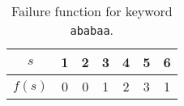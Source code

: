 \begin{table}[!ht]
    \centering
    \begin{tabular}{|c||c|c|c|c|c|c|}
        \hline
        $s$ & 1 & 2 & 3 & 4 & 5 & 6 \\
        \hline
        $f(s)$ & 0 & 0 & 1 & 2 & 3 & 1 \\
        \hline
    \end{tabular}
    \caption{Failure function for keyword \texttt{ababaa}.}
    \label{tab:030406}
\end{table}
